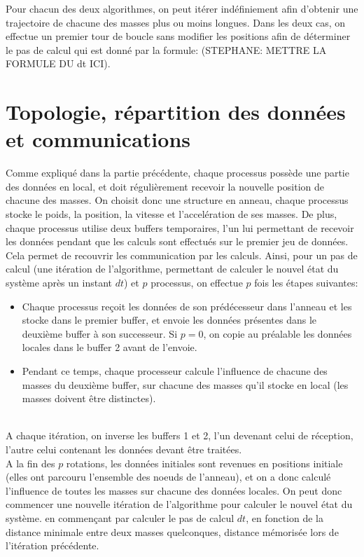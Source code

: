 \documentclass[a4paper,11pt]{article}
\begin{document}
Pour chacun des deux algorithmes, on peut itérer indéfiniement afin d'obtenir une trajectoire de chacune des masses plus ou moins longues. Dans les deux cas, on effectue un premier tour de boucle sans modifier les positions afin de déterminer le pas de calcul qui est donné par la formule: (STEPHANE: METTRE LA FORMULE DU dt ICI).





\section{Topologie, répartition des données et communications}
Comme expliqué dans la partie précédente, chaque processus possède une partie des données en local, et doit régulièrement recevoir la nouvelle position de chacune des masses. On choisit donc une structure en anneau, chaque processus stocke le poids, la position, la vitesse et l'accelération de ses masses. De plus, chaque processus utilise deux buffers temporaires, l'un lui permettant de recevoir les données pendant que les calculs sont effectués sur le premier jeu de données. Cela permet de recouvrir les communication par les calculs. Ainsi, pour un pas de calcul (une itération de l'algorithme, permettant de calculer le nouvel état du système après un instant $dt$) et $p$ processus, on effectue $p$ fois les étapes suivantes:\\
\begin{itemize}
\item Chaque processus reçoit les données de son prédécesseur dans l'anneau et les stocke dans le premier buffer, et envoie les données présentes dans le deuxième buffer à son successeur. Si $p = 0$, on copie au préalable les données locales dans le buffer 2 avant de l'envoie.
\item Pendant ce temps, chaque processeur calcule l'influence de chacune des masses du deuxième buffer, sur chacune des masses qu'il stocke en local (les masses doivent être distinctes).
\end{itemize}\\
 A chaque itération, on inverse les buffers 1 et 2, l'un devenant celui de réception, l'autre celui contenant les données devant être traitées.\\
 
 A la fin des $p$ rotations, les données initiales sont revenues en positions initiale (elles ont parcouru l'ensemble des noeuds de l'anneau), et on a donc calculé l'influence de toutes les masses sur chacune des données locales.
 On peut donc commencer une nouvelle itération de l'algorithme pour calculer le nouvel état du système. en commençant par calculer le pas de calcul $dt$, en fonction de la distance minimale entre deux masses quelconques, distance mémorisée lors de l'itération précédente.
 
\end{document}
